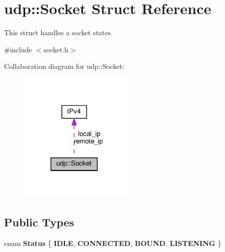 \hypertarget{structudp_1_1Socket}{}\section{udp\+:\+:Socket Struct Reference}
\label{structudp_1_1Socket}


This struct handles a socket states.  




{\ttfamily \#include $<$socket.\+h$>$}



Collaboration diagram for udp\+:\+:Socket\+:\nopagebreak
\begin{figure}[H]
\begin{center}
\leavevmode
\includegraphics[width=158pt]{structudp_1_1Socket__coll__graph}
\end{center}
\end{figure}
\subsection*{Public Types}
\begin{DoxyCompactItemize}
\item 
enum {\bfseries Status} \{ {\bfseries I\+D\+LE}, 
{\bfseries C\+O\+N\+N\+E\+C\+T\+ED}, 
{\bfseries B\+O\+U\+ND}, 
{\bfseries L\+I\+S\+T\+E\+N\+I\+NG}
 \}\hypertarget{structudp_1_1Socket_a210a8bbcc2ed79b2afdb2c36604bf6fc}{}\label{structudp_1_1Socket_a210a8bbcc2ed79b2afdb2c36604bf6fc}

\end{DoxyCompactItemize}
